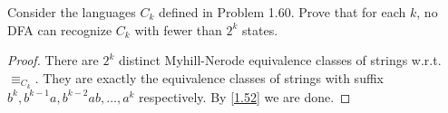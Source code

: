 \begin{exercise}{1.61}
  Consider the languages $C_k$ defined in Problem 1.60. Prove that for each $k$, no DFA can recognize $C_k$ with fewer than $2^k$ states.
\end{exercise}

\begin{proof}
  There are $2^k$ distinct Myhill-Nerode equivalence classes of strings w.r.t. $\equiv_{C_k}$. They are exactly the equivalence classes of strings with suffix $b^k, b^{k-1}a,b^{k-2}ab,\dots,a^k$ respectively. By \ref{1.52} we are done.
\end{proof}
